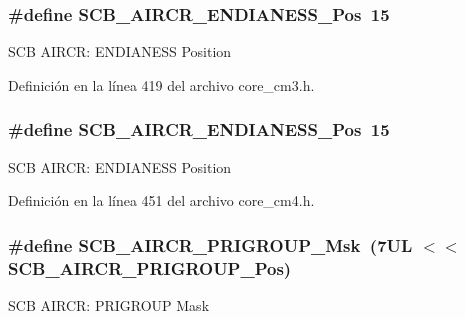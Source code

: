 \subsubsection[{\texorpdfstring{S\+C\+B\+\_\+\+A\+I\+R\+C\+R\+\_\+\+E\+N\+D\+I\+A\+N\+E\+S\+S\+\_\+\+Pos}{SCB_AIRCR_ENDIANESS_Pos}}]{\setlength{\rightskip}{0pt plus 5cm}\#define S\+C\+B\+\_\+\+A\+I\+R\+C\+R\+\_\+\+E\+N\+D\+I\+A\+N\+E\+S\+S\+\_\+\+Pos~15}\hypertarget{group___c_m_s_i_s___s_c_b_gad31dec98fbc0d33ace63cb1f1a927923}{}\label{group___c_m_s_i_s___s_c_b_gad31dec98fbc0d33ace63cb1f1a927923}
S\+CB A\+I\+R\+CR\+: E\+N\+D\+I\+A\+N\+E\+SS Position 

Definición en la línea 419 del archivo core\+\_\+cm3.\+h.

\subsubsection[{\texorpdfstring{S\+C\+B\+\_\+\+A\+I\+R\+C\+R\+\_\+\+E\+N\+D\+I\+A\+N\+E\+S\+S\+\_\+\+Pos}{SCB_AIRCR_ENDIANESS_Pos}}]{\setlength{\rightskip}{0pt plus 5cm}\#define S\+C\+B\+\_\+\+A\+I\+R\+C\+R\+\_\+\+E\+N\+D\+I\+A\+N\+E\+S\+S\+\_\+\+Pos~15}\hypertarget{group___c_m_s_i_s___s_c_b_gad31dec98fbc0d33ace63cb1f1a927923}{}\label{group___c_m_s_i_s___s_c_b_gad31dec98fbc0d33ace63cb1f1a927923}
S\+CB A\+I\+R\+CR\+: E\+N\+D\+I\+A\+N\+E\+SS Position 

Definición en la línea 451 del archivo core\+\_\+cm4.\+h.

\subsubsection[{\texorpdfstring{S\+C\+B\+\_\+\+A\+I\+R\+C\+R\+\_\+\+P\+R\+I\+G\+R\+O\+U\+P\+\_\+\+Msk}{SCB_AIRCR_PRIGROUP_Msk}}]{\setlength{\rightskip}{0pt plus 5cm}\#define S\+C\+B\+\_\+\+A\+I\+R\+C\+R\+\_\+\+P\+R\+I\+G\+R\+O\+U\+P\+\_\+\+Msk~(7\+U\+L $<$$<$ S\+C\+B\+\_\+\+A\+I\+R\+C\+R\+\_\+\+P\+R\+I\+G\+R\+O\+U\+P\+\_\+\+Pos)}\hypertarget{group___c_m_s_i_s___s_c_b_ga8be60fff03f48d0d345868060dc6dae7}{}\label{group___c_m_s_i_s___s_c_b_ga8be60fff03f48d0d345868060dc6dae7}
S\+CB A\+I\+R\+CR\+: P\+R\+I\+G\+R\+O\+UP Mask 

